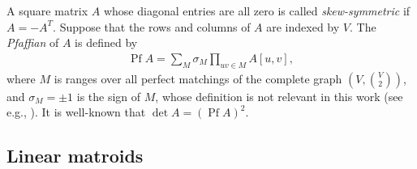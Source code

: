 \documentclass[10pt,a4paper]{article}
\DeclareMathOperator{\Pf}{Pf}
\begin{document}
A square matrix $A$ whose diagonal entries are all zero is called \emph{skew-symmetric} if $A = -A^T$.
Suppose that the rows and columns of $A$ are indexed by $V$.
The \emph{Pfaffian} of $A$ is defined by
\begin{align*}
  \Pf A = \sum_{M} \sigma_M \prod_{uv \in M} A[u, v],
\end{align*}
where $M$ is ranges over all perfect matchings of the complete graph $(V, \binom{V}{2})$, and $\sigma_M = \pm 1$ is the sign of $M$, whose definition is not relevant in this work (see e.g., \cite{murota1999matrices}).
It is well-known that $\det A = (\Pf A)^2$.

\subsection{Linear matroids}
\label{sec:prel-matroids}
\end{document}

